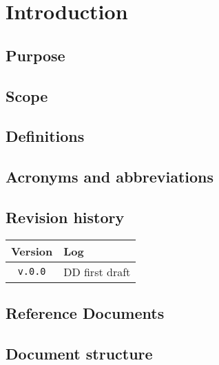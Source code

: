 \section{Introduction}
\label{sec:intro}
   \subsection{Purpose}

   \subsection{Scope}

   \subsection{Definitions}

    \subsection{Acronyms and abbreviations}

    \subsection{Revision history}

  \label{sec:revhistory}
    \begin{table}[!h]
      \begin{tabular}{|c|l|}
        \hline
        \textbf{Version}                & \textbf{Log} \\ \hline
        \texttt{v.0.0} &
          DD first draft
        \\
 \hline
      \end{tabular}
    \end{table}



\subsection{Reference Documents} 
  \subsection{Document structure}

